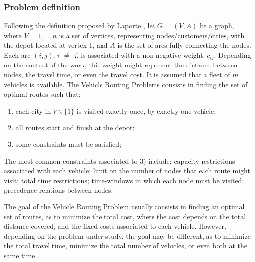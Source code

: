 \subsubsection{Problem definition}
\label{sec:vrp_classic}

Following the definition proposed by Laporte \cite{vrp_exact}, let $G$ = $(V,A)$ be a graph, where $V={1, ..., n}$ is a set of vertices, representing nodes/customers/cities, with the depot located at vertex 1, and $A$ is the set of arcs fully connecting the nodes. Each arc $(i,j)$, $i$ $\neq$ $j$, is associated with a non negative weight, $c_{ij}$. Depending on the context of the work, this weight might represent the distance between nodes, the travel time, or even the travel cost. It is assumed that a fleet of $m$ vehicles is available. The Vehicle Routing Problems consists in finding the set of optimal routes such that:

\begin{enumerate}
  \item each city in $V\backslash\{1\}$ is visited exactly once, by exactly one vehicle;
  \item all routes start and finish at the depot;
  \item some constraints must be satisfied;
\end{enumerate}

The most common constraints associated to 3) include: capacity restrictions associated with each vehicle; limit on the number of nodes that each route might visit; total time restrictions; time-windows in which each node must be visited; precedence relations between nodes. 

The goal of the Vehicle Routing Problem usually consists in finding an optimal set of routes, as to minimize the total cost, where the cost depends on the total distance covered, and the fixed costs associated to each vehicle.  However, depending on the problem under study, the goal may be different, as to  minimize the total travel time, minimize the total number of vehicles, or even both at the same time \cite{TDVRP_multi_objective_aco}.

